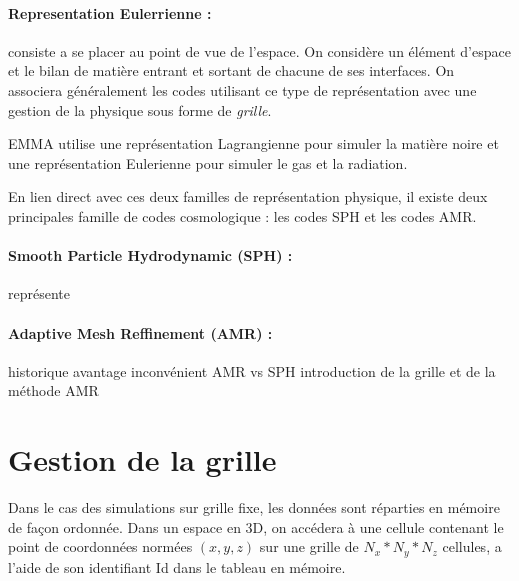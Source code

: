 \paragraph{Representation Eulerrienne : } 
consiste a se placer au point de vue de l'espace.
On considère un élément d'espace et le bilan de matière entrant et sortant de chacune de ses interfaces.
On associera généralement les codes utilisant ce type de représentation avec une gestion de la physique sous forme de \emph{grille}.

EMMA utilise une représentation Lagrangienne pour simuler la matière noire et une représentation Eulerienne pour simuler le gas et la radiation.

En lien direct avec ces deux familles de représentation physique, il existe deux principales famille de codes cosmologique : les codes \ac{SPH} et les codes \ac{AMR}.



\paragraph{Smooth Particle Hydrodynamic (SPH) : } représente 

\paragraph{Adaptive Mesh Reffinement (AMR) :  }




historique
avantage inconvénient AMR vs SPH
introduction de la grille et de la méthode AMR

\section{Gestion de la grille}

Dans le cas des simulations sur grille fixe, les données sont réparties en mémoire de façon ordonnée.
Dans un espace en 3D, on accédera à une cellule contenant le point de coordonnées normées $(x,y,z)$ sur une grille de $N_x*N_y*N_z$ cellules, a l'aide de son identifiant Id dans le tableau en mémoire.

